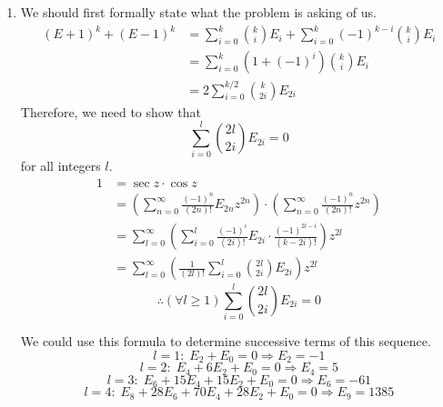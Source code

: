 \item

\begin{enumerate}[wide, labelindent = 0pt, label = (\alph*)]
	\item
	      We should first formally state what the problem is asking of us.
	      \begin{align*}
		      {(E + 1)}^k + {(E - 1)}^k
		       & = \sum_{i = 0}^k \binom{k}{i} E_i + \sum_{i = 0}^k {(-1)}^{k - i} \binom{k}{i} E_i \\
		       & = \sum_{i = 0}^k \left( 1 + {(-1)}^i \right) \binom{k}{i} E_i                      \\
		       & = 2 \sum_{i = 0}^{k / 2} \binom{k}{2i} E_{2i}
	      \end{align*}
	      Therefore, we need to show that
	      \[
		      \sum_{i = 0}^{l} \binom{2l}{2i} E_{2i} = 0
	      \]
	      for all integers $l$.
	      \begin{align*}
		      1
		       & = \sec z \cdot \cos z        \\
		       & = \left(
		      \sum_{n = 0}^\infty \frac{{(-1)}^n}{(2n)!} E_{2n} z^{2n}
		      \right) \cdot \left(
		      \sum_{n = 0}^\infty \frac{{(-1)}^n}{(2n)!} z^{2n}
		      \right)                         \\
		       & = \sum_{l = 0}^\infty \left(
		      \sum_{i = 0}^l \frac{{(-1)}^i}{(2i)!} E_{2i} \cdot \frac{{(-1)}^{2l - i}}{(k - 2i)!}
		      \right) z^{2l}                  \\
		       & = \sum_{l = 0}^\infty \left(
		      \frac{1}{(2l)!} \sum_{i = 0}^l \binom{2l}{2i} E_{2i}
		      \right) z^{2l}
	      \end{align*}
	      \[
		      \therefore (\forall l \geq 1) \sum_{i = 0}^l \binom{2l}{2i} E_{2i} = 0
	      \]

	      We could use this formula to determine successive terms of this sequence.
	      \[
		      l = 1:\; E_2 + E_0 = 0 \Rightarrow E_2 = -1
	      \]
	      \[
		      l = 2:\; E_4 + 6E_2 + E_0 = 0 \Rightarrow E_4 = 5
	      \]
	      \[
		      l = 3:\; E_6 + 15E_4 + 15E_2 + E_0 = 0 \Rightarrow E_6 = -61
	      \]
	      \[
		      l = 4:\; E_8 + 28E_6 + 70E_4 + 28E_2 + E_0 = 0 \Rightarrow E_9 = 1385
	      \]


\end{enumerate}
